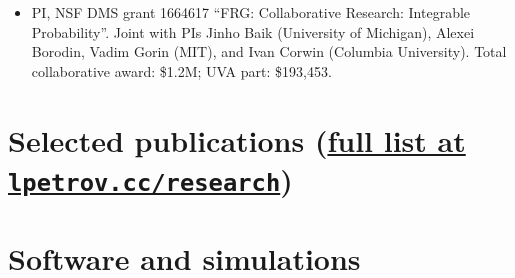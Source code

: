 \documentclass[letterpaper,11pt]{article}
\begin{document}
\begin{itemize}
	\item
			[2017--2022:] PI, NSF DMS grant 1664617
	      ``FRG: Collaborative Research: Integrable Probability''.
	      Joint with PIs Jinho Baik (University of Michigan), Alexei
	      Borodin, Vadim Gorin (MIT), and Ivan Corwin (Columbia University).
	      Total collaborative award: \$1.2M; UVA part: \$193,453.
\end{itemize}

\section*{Selected publications ({\normalsize\href{https://lpetrov.cc/research/}{full list at \texttt{lpetrov.cc/research}}})}



\section*{Software and simulations}
\end{document}

